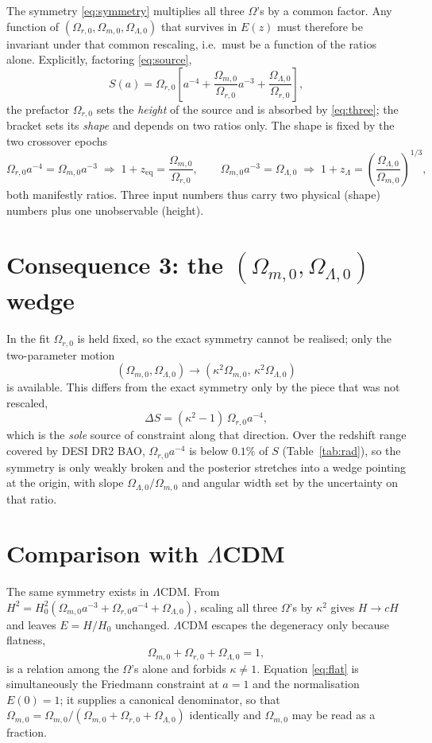 \documentclass[11pt]{article}
\newcommand{\Om}{\Omega_{m,0}}
\newcommand{\Or}{\Omega_{r,0}}
\newcommand{\OL}{\Omega_{\Lambda,0}}
\begin{document}
The symmetry \eqref{eq:symmetry} multiplies all three $\Omega$'s by a common
factor. Any function of $(\Or,\Om,\OL)$ that survives in $E(z)$ must therefore
be invariant under that common rescaling, i.e.\ must be a function of the
ratios alone. Explicitly, factoring \eqref{eq:source},
\begin{equation}
S(a) = \Or\left[a^{-4} + \frac{\Om}{\Or}a^{-3} + \frac{\OL}{\Or}\right],
\end{equation}
the prefactor $\Or$ sets the \emph{height} of the source and is absorbed by
\eqref{eq:three}; the bracket sets its \emph{shape} and depends on two ratios
only. The shape is fixed by the two crossover epochs
\begin{equation}
\Or a^{-4} = \Om a^{-3} \;\Longrightarrow\; 1+z_{\mathrm{eq}} = \frac{\Om}{\Or},
\qquad
\Om a^{-3} = \OL \;\Longrightarrow\; 1+z_\Lambda = \left(\frac{\OL}{\Om}\right)^{1/3},
\end{equation}
both manifestly ratios. Three input numbers thus carry two physical
(shape) numbers plus one unobservable (height).

\section{Consequence 3: the $(\Om,\OL)$ wedge}

In the fit $\Or$ is held fixed, so the exact symmetry cannot be realised; only
the two-parameter motion
\begin{equation}
(\Om,\OL)\to(\kappa^2\Om,\,\kappa^2\OL)
\end{equation}
is available. This differs from the exact symmetry only by the piece that was
not rescaled,
\begin{equation}
\Delta S = (\kappa^2-1)\,\Or a^{-4},
\end{equation}
which is the \emph{sole} source of constraint along that direction. Over the
redshift range covered by DESI DR2 BAO, $\Or a^{-4}$ is below $0.1\%$ of $S$
(Table~\ref{tab:rad}), so the symmetry is only weakly broken and the posterior
stretches into a wedge pointing at the origin, with slope $\OL/\Om$ and angular
width set by the uncertainty on that ratio.

\section{Comparison with $\Lambda$CDM}

The same symmetry exists in $\Lambda$CDM. From
$H^2 = H_0^2(\Om a^{-3}+\Or a^{-4}+\OL)$, scaling all three $\Omega$'s by $\kappa^2$
gives $H\to cH$ and leaves $E=H/H_0$ unchanged. $\Lambda$CDM escapes the
degeneracy only because flatness,
\begin{equation}
\Om + \Or + \OL = 1,
\label{eq:flat}
\end{equation}
is a relation among the $\Omega$'s alone and forbids $\kappa\neq1$. Equation
\eqref{eq:flat} is simultaneously the Friedmann constraint at $a=1$ and the
normalisation $E(0)=1$; it supplies a canonical denominator, so that
$\Om = \Om/(\Om{+}\Or{+}\OL)$ identically and $\Om$ may be read as a fraction.
\end{document}
